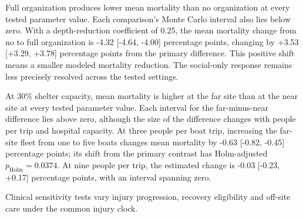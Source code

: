 Full organization produces lower mean mortality than no organization at every tested parameter value. Each comparison's Monte Carlo interval also lies below zero. With a depth-reduction coefficient of 0.25, the mean mortality change from no to full organization is -4.32 [-4.64, -4.00] percentage points, changing by +3.53 [+3.29, +3.78] percentage points from the primary difference. This positive shift means a smaller modeled mortality reduction. The social-only response remains less precisely resolved across the tested settings.

At 30\% shelter capacity, mean mortality is higher at the far site than at the near site at every tested parameter value. Each interval for the far-minus-near difference lies above zero, although the size of the difference changes with people per trip and hospital capacity. At three people per boat trip, increasing the far-site fleet from one to five boats changes mean mortality by -0.63 [-0.82, -0.45] percentage points; its shift from the primary contrast has Holm-adjusted $p_{\mathrm{Holm}}=0.0374$. At nine people per trip, the estimated change is -0.03 [-0.23, +0.17] percentage points, with an interval spanning zero.

Clinical sensitivity tests vary injury progression, recovery eligibility and off-site care under the common injury clock.

